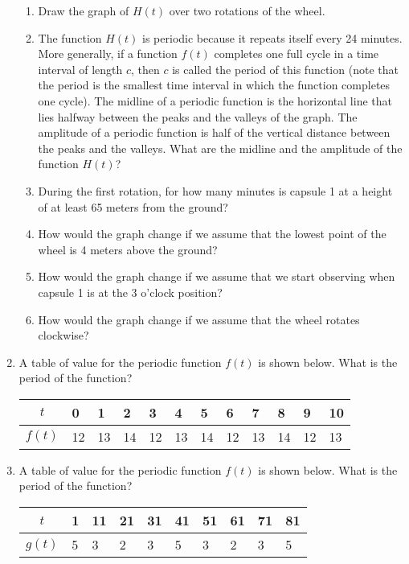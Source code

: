 \documentclass[11pt,dvipsnames]{article}
\begin{document}
\begin{enumerate}[label= {\bf  \arabic*:}]
\begin{enumerate}
\item Draw the graph of $H(t)$ over two rotations of the wheel.
\item The function $H(t)$ is periodic because it repeats itself every 24 minutes. More generally, if a function $f(t)$ completes one full cycle in a time interval of length $c$, then $c$ is called the period of this function (note that the period is the smallest time interval in which the function completes one cycle). The midline of a periodic function is the horizontal line that lies halfway between the peaks and the valleys of the graph. The amplitude of a periodic function is half of the vertical distance between the peaks and the valleys. What are the midline and the amplitude of the function $H(t)$?
\item During the first rotation, for how many minutes is capsule 1 at a height of at least 65 meters from the ground?
\item How would the graph change if we assume that the lowest point of the wheel is 4 meters above the ground?
\item How would the graph change if we assume that we start observing when capsule 1 is at the 3 o'clock position? 
\item How would the graph change if we assume that the wheel rotates clockwise?

\end{enumerate}
 \item A table of value for the periodic function $f(t)$ is shown below. What is the period of the function?
 
 \begin{minipage}{\linewidth}
\centering
\begin{tabularx}{0.8\textwidth}{|X|X|X|X|X|X|X|X|X|X|X|X|X|}
\hline
\multicolumn{2}{|c|}{$t$}         &0&1& 2 & 3 & 4 & 5 & 6 & 7 &8&9&10\\ \hline
\multicolumn{2}{|c|}{$f(t)$}   & 12&13 & 14    &12     &13     &14     &12     &13&14 &12 & 13    \\ \hline
\end{tabularx}
\end{minipage}

\item A table of value for the periodic function $f(t)$ is shown below. What is the period of the function?
 
 \begin{minipage}{\linewidth}
\centering
\begin{tabularx}{0.8\textwidth}{|X|X|X|X|X|X|X|X|X|X|X|}
\hline
\multicolumn{2}{|c|}{$t$}         &1&11& 21 & 31 & 41 & 51 & 61 & 71 &81\\ \hline
\multicolumn{2}{|c|}{$g(t)$}   & 5&3 & 2    &3     &5     &3     &2     &3&5 \\ \hline
\end{tabularx}
\end{minipage}

\end{enumerate}
\end{document}

